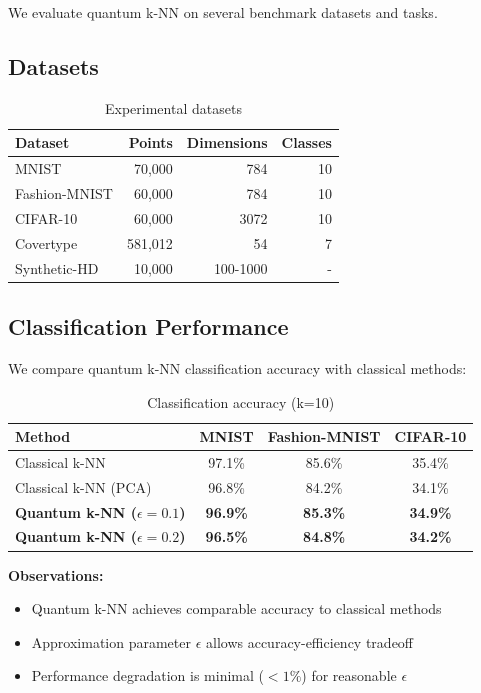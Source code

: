 \documentclass[11pt]{article}
\begin{document}
We evaluate quantum k-NN on several benchmark datasets and tasks.

\subsection{Datasets}

\begin{table}[ht]
\centering
\caption{Experimental datasets}
\begin{tabular}{lrrr}
\toprule
\textbf{Dataset} & \textbf{Points} & \textbf{Dimensions} & \textbf{Classes} \\
\midrule
MNIST & 70,000 & 784 & 10 \\
Fashion-MNIST & 60,000 & 784 & 10 \\
CIFAR-10 & 60,000 & 3072 & 10 \\
Covertype & 581,012 & 54 & 7 \\
Synthetic-HD & 10,000 & 100-1000 & - \\
\bottomrule
\end{tabular}
\label{tab:datasets}
\end{table}

\subsection{Classification Performance}

We compare quantum k-NN classification accuracy with classical methods:

\begin{table}[ht]
\centering
\caption{Classification accuracy (k=10)}
\begin{tabular}{lccc}
\toprule
\textbf{Method} & \textbf{MNIST} & \textbf{Fashion-MNIST} & \textbf{CIFAR-10} \\
\midrule
Classical k-NN & 97.1\% & 85.6\% & 35.4\% \\
Classical k-NN (PCA) & 96.8\% & 84.2\% & 34.1\% \\
\textbf{Quantum k-NN ($\epsilon=0.1$)} & \textbf{96.9\%} & \textbf{85.3\%} & \textbf{34.9\%} \\
\textbf{Quantum k-NN ($\epsilon=0.2$)} & \textbf{96.5\%} & \textbf{84.8\%} & \textbf{34.2\%} \\
\bottomrule
\end{tabular}
\label{tab:classification}
\end{table}

\textbf{Observations:}
\begin{itemize}
    \item Quantum k-NN achieves comparable accuracy to classical methods
    \item Approximation parameter $\epsilon$ allows accuracy-efficiency tradeoff
    \item Performance degradation is minimal ($< 1\%$) for reasonable $\epsilon$
\end{itemize}
\end{document}
